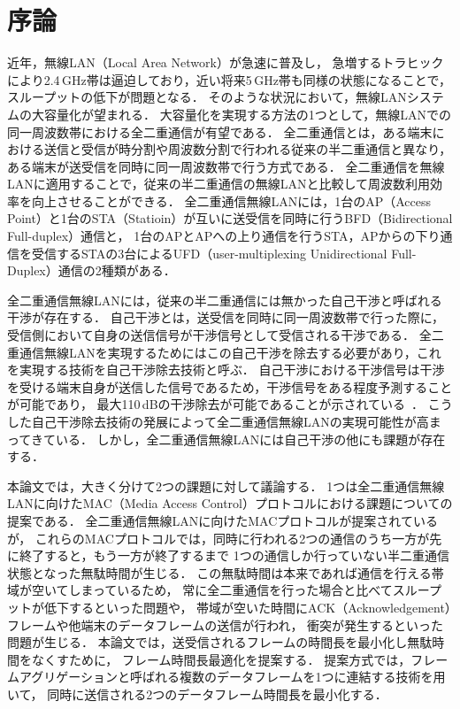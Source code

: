 \documentclass[master]{kuisthesis}		%
\begin{document}
\section{序論} \label{sec:intro}
近年，無線LAN（Local Area Network）が急速に普及し，
急増するトラヒックにより2.4\,GHz帯は逼迫しており，近い将来5\,GHz帯も同様の状態になることで，
スループットの低下が問題となる．
そのような状況において，無線LANシステムの大容量化が望まれる．
大容量化を実現する方法の1つとして，無線LANでの同一周波数帯における全二重通信が有望である．
全二重通信とは，ある端末における送信と受信が時分割や周波数分割で行われる従来の半二重通信と異なり，
ある端末が送受信を同時に同一周波数帯で行う方式である．
全二重通信を無線LANに適用することで，従来の半二重通信の無線LANと比較して周波数利用効率を向上させることができる．
全二重通信無線LANには，1台のAP（Access Point）と1台のSTA（Statioin）が互いに送受信を同時に行うBFD（Bidirectional Full-duplex）通信と，
1台のAPとAPへの上り通信を行うSTA，APからの下り通信を受信するSTAの3台によるUFD（user-multiplexing Unidirectional Full-Duplex）通信の2種類がある．
\par
全二重通信無線LANには，従来の半二重通信には無かった自己干渉と呼ばれる干渉が存在する．
自己干渉とは，送受信を同時に同一周波数帯で行った際に，
受信側において自身の送信信号が干渉信号として受信される干渉である．
全二重通信無線LANを実現するためにはこの自己干渉を除去する必要があり，これを実現する技術を自己干渉除去技術と呼ぶ．
自己干渉における干渉信号は干渉を受ける端末自身が送信した信号であるため，干渉信号をある程度予測することが可能であり，
最大110\,dBの干渉除去が可能であることが示されている~\cite{stanford1,fdmac}．
こうした自己干渉除去技術の発展によって全二重通信無線LANの実現可能性が高まってきている．
しかし，全二重通信無線LANには自己干渉の他にも課題が存在する．

\par
本論文では，大きく分けて2つの課題に対して議論する．
1つは全二重通信無線LANに向けたMAC（Media Access Control）プロトコルにおける課題についての提案である．
全二重通信無線LANに向けたMACプロトコル\cite{fdmac,contra,janus}が提案されているが，
これらのMACプロトコルでは，同時に行われる2つの通信のうち一方が先に終了すると，もう一方が終了するまで
1つの通信しか行っていない半二重通信状態となった無駄時間が生じる．
この無駄時間は本来であれば通信を行える帯域が空いてしまっているため，
常に全二重通信を行った場合と比べてスループットが低下するといった問題や，
帯域が空いた時間にACK（Acknowledgement）フレームや他端末のデータフレームの送信が行われ，
衝突が発生するといった問題が生じる．
本論文では，送受信されるフレームの時間長を最小化し無駄時間をなくすために，
フレーム時間長最適化を提案する．
提案方式では，フレームアグリゲーションと呼ばれる複数のデータフレームを1つに連結する技術を用いて，
同時に送信される2つのデータフレーム時間長を最小化する．
\end{document}
